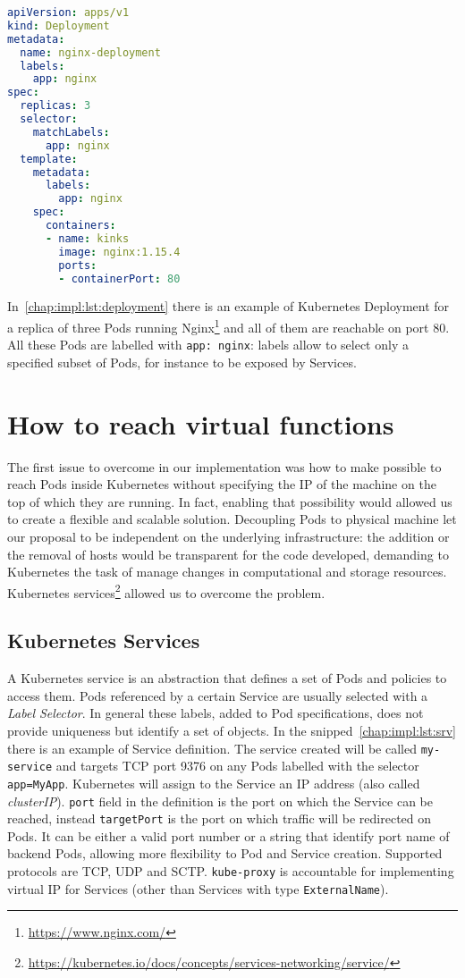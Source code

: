 \begin{lstlisting}[caption={Example of Deployment definition},
                   captionpos=b, language=yaml, label=chap:impl:lst:deployment]
apiVersion: apps/v1
kind: Deployment
metadata:
  name: nginx-deployment
  labels:
    app: nginx
spec:
  replicas: 3
  selector:
    matchLabels:
      app: nginx
  template:
    metadata:
      labels:
        app: nginx
    spec:
      containers:
      - name: kinks
        image: nginx:1.15.4
        ports:
        - containerPort: 80
\end{lstlisting}
In~\ref{chap:impl:lst:deployment} there is an example of Kubernetes Deployment
for a replica of three Pods running Nginx\footnote{\url{https://www.nginx.com/}}
and all of them are reachable on port $80$. All these Pods are labelled with
\texttt{app: nginx}: labels allow to select only a specified subset of Pods,
for instance to be exposed by Services.

\section{How to reach virtual functions}
The first issue to overcome in our implementation was how to make possible to
reach Pods inside Kubernetes without specifying the IP of the machine on the top
of which they are running. In fact, enabling that possibility would allowed us
to create a flexible and scalable solution. Decoupling Pods to physical
machine let our proposal to be independent on the underlying infrastructure: the
addition or the removal of hosts would be transparent for the code developed,
demanding to Kubernetes the task of manage changes in computational and
storage resources. Kubernetes
services\footnote{\url{https://kubernetes.io/docs/concepts/services-networking/service/}}
allowed us to overcome the problem.

\subsection{Kubernetes Services} \label{chap:impl:subsec:services}
A Kubernetes service is an abstraction that defines a set of Pods and policies
to access them. Pods referenced by a certain Service are usually selected with a
\emph{Label Selector}. In general these labels, added to Pod specifications,
does not provide uniqueness but identify a set of objects.
In the snipped~\ref{chap:impl:lst:srv} there is an example of Service
definition. The service created will be called \texttt{my-service} and targets
TCP port 9376 on any Pods labelled with the selector \texttt{app=MyApp}.
Kubernetes will assign to the Service an IP address (also called 
\emph{clusterIP}). \texttt{port} field in the definition is the port on which
the Service can be
reached, instead \texttt{targetPort} is the port on which traffic will be
redirected on Pods. It can be either a valid port number or a string that
identify port name of backend Pods, allowing more flexibility to Pod and Service
creation. Supported protocols are TCP, UDP and SCTP. \texttt{kube-proxy} is
accountable for implementing virtual IP for Services (other than Services with
type \texttt{ExternalName}). 


